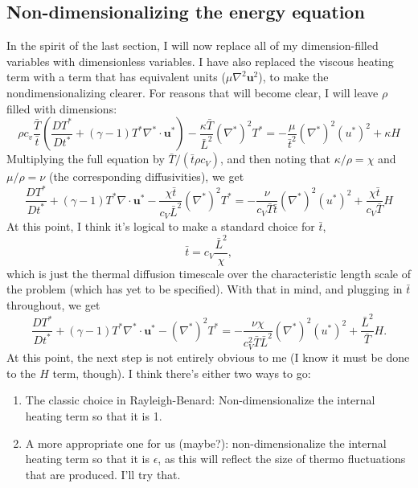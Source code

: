 \documentclass[aps, pre, onecolumn, nofootinbib, notitlepage, groupedaddress, amsfonts, amssymb, amsmath, longbibliography]{revtex4-1}
\newcommand{\grad}{\ensuremath{\nabla}}
\begin{document}
\subsection{Non-dimensionalizing the energy equation}
In the spirit of the last section, I will now replace all of my dimension-filled variables
with dimensionless variables.  I have also replaced the viscous heating term with a term
that has equivalent units ($\mu \grad^2 \bm{u}^2$), to make the nondimensionalizing clearer.
For reasons that will become clear, I will leave $\rho$ filled with dimensions:
\begin{equation}
\rho c_v \frac{\bar{T}}{\bar{t}}\left(\frac{D T^*}{D t^*} + (\gamma - 1)T^*\grad^*\cdot\bm{u}^*\right)
- \frac{\kappa \bar{T}}{\bar{L}^2} (\grad^*)^2 T^* = - \frac{\mu}{\bar{t}^2}(\grad^*)^2 (u^*)^2
+ \kappa H
\end{equation}
Multiplying the full equation by $\bar{T}/ (\bar{t} \rho c_V)$, and then noting that
$\kappa / \rho = \chi$ and $\mu / \rho = \nu$ (the corresponding diffusivities), we get
\begin{equation}
\frac{D T^*}{D t^*} + (\gamma - 1)T^*\grad \cdot\bm{u}^* - \frac{\chi \bar{t}}{c_V \bar{L}^2}
(\grad^*)^2 T^* = -\frac{\nu}{c_V\bar{T}\bar{t}}(\grad^*)^2(u^*)^2 + \frac{\chi \bar{t}}{c_V\bar{T}} H
\end{equation}
At this point, I think it's logical to make a standard choice for $\bar{t}$,
$$
\bar{t} = c_V\frac{\bar{L}^2}{\chi},
$$
which is just the thermal diffusion timescale over the characteristic length scale of the
problem (which has yet to be specified).  With that in mind, and plugging in $\bar{t}$
throughout, we get
\begin{equation}
\frac{D T^*}{D t^*} + (\gamma - 1) T^* \grad^*\cdot\bm{u}^* - (\grad^*)^2T^* =
-\frac{\nu\chi}{c_V^2 \bar{T} \bar{L}^2} (\grad^*)^2(u^*)^2 + \frac{\bar{L}^2}{\bar{T}} H.
\end{equation}
At this point, the next step is not entirely obvious to me (I know it must be done to the
$H$ term, though).  I think there's either two ways to go:
\begin{enumerate}
\item The classic choice in Rayleigh-Benard: Non-dimensionalize the internal heating term
so that it is 1.
\item A more appropriate one for us (maybe?): non-dimensionalize the internal heating term
so that it is $\epsilon$, as this will reflect the size of thermo fluctuations that are produced.
I'll try that.
\end{enumerate}
\end{document}
